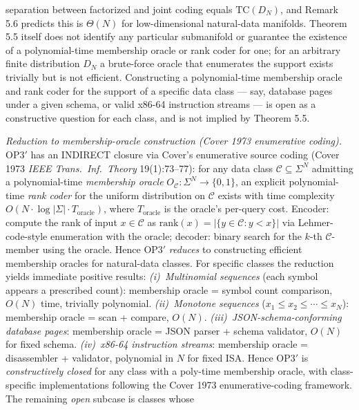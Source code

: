 \documentclass[
]{article}
\begin{document}
\begin{itemize}
  separation between factorized and joint coding equals
  $\mathrm{TC}(D_N)$, and Remark 5.6 predicts this is $\Theta(N)$
  for low-dimensional natural-data manifolds. Theorem 5.5 itself
  does not identify any particular submanifold or guarantee the
  existence of a polynomial-time membership oracle or rank coder
  for one; for an arbitrary finite distribution $D_N$ a brute-force
  oracle that enumerates the support exists trivially but is not
  efficient. Constructing a polynomial-time membership oracle and
  rank coder for the support of a specific data class --- say,
  database pages under a given schema, or valid x86-64 instruction
  streams --- is open as a constructive question for each class, and
  is not implied by Theorem 5.5.

  \emph{Reduction to membership-oracle construction (Cover 1973
  enumerative coding).} OP3$'$ has an INDIRECT closure via Cover's
  enumerative source coding (Cover 1973 \emph{IEEE Trans.\ Inf.\
  Theory} 19(1):73--77): for any data class $\mathcal{C} \subseteq
  \Sigma^N$ admitting a polynomial-time \emph{membership oracle}
  $O_{\mathcal{C}} : \Sigma^N \to \{0, 1\}$, an explicit
  polynomial-time \emph{rank coder} for the uniform distribution on
  $\mathcal{C}$ exists with time complexity
  $O(N \cdot \log|\Sigma| \cdot T_{\mathrm{oracle}})$, where
  $T_{\mathrm{oracle}}$ is the oracle's per-query cost. Encoder:
  compute the rank of input $x \in \mathcal{C}$ as
  $\mathrm{rank}(x) = |\{y \in \mathcal{C} : y < x\}|$ via
  Lehmer-code-style enumeration with the oracle; decoder: binary
  search for the $k$-th $\mathcal{C}$-member using the oracle.
  Hence OP3$'$ \emph{reduces} to constructing efficient membership
  oracles for natural-data classes. For specific classes the
  reduction yields immediate positive results:
  \emph{(i)~Multinomial sequences} (each symbol appears a prescribed
  count): membership oracle = symbol count comparison, $O(N)$ time,
  trivially polynomial.
  \emph{(ii)~Monotone sequences} ($x_1 \leq x_2 \leq \cdots \leq x_N$):
  membership oracle = scan + compare, $O(N)$.
  \emph{(iii)~JSON-schema-conforming database pages}: membership oracle
  = JSON parser + schema validator, $O(N)$ for fixed schema.
  \emph{(iv)~x86-64 instruction streams}: membership oracle =
  disassembler + validator, polynomial in $N$ for fixed ISA.
  Hence OP3$'$ is \emph{constructively closed} for any class with a
  poly-time membership oracle, with class-specific
  implementations following the Cover 1973 enumerative-coding
  framework. The remaining \emph{open} subcase is classes whose

\end{itemize}
\end{document}
